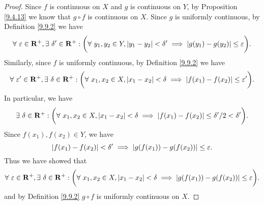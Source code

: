 \begin{proof}
    Since \(f\) is continuous on \(X\) and \(g\) is continuous on \(Y\), by Proposition \ref{9.4.13} we know that \(g \circ f\) is continuous on \(X\).
    Since \(g\) is uniformly continuous, by Definition \ref{9.9.2} we have
    \[
        \forall\ \varepsilon \in \mathbf{R}^+, \exists\ \delta' \in \mathbf{R}^+ : \bigg(\forall\ y_1, y_2 \in Y, \abs*{y_1 - y_2} < \delta' \implies \abs*{g(y_1) - g(y_2)} \leq \varepsilon\bigg).
    \]
    Similarly, since \(f\) is uniformly continuous, by Definition \ref{9.9.2} we have
    \[
        \forall\ \varepsilon' \in \mathbf{R}^+, \exists\ \delta \in \mathbf{R}^+ : \bigg(\forall\ x_1, x_2 \in X, \abs*{x_1 - x_2} < \delta \implies \abs*{f(x_1) - f(x_2)} \leq \varepsilon'\bigg).
    \]
    In particular, we have
    \[
        \exists\ \delta \in \mathbf{R}^+ : \bigg(\forall\ x_1, x_2 \in X, \abs*{x_1 - x_2} < \delta \implies \abs*{f(x_1) - f(x_2)} \leq \delta' / 2 < \delta'\bigg).
    \]
    Since \(f(x_1), f(x_2) \in Y\), we have
    \[
        \abs*{f(x_1) - f(x_2)} < \delta' \implies \abs*{g(f(x_1)) - g(f(x_2))} \leq \varepsilon.
    \]
    Thus we have showed that
    \[
        \forall\ \varepsilon \in \mathbf{R}^+, \exists\ \delta \in \mathbf{R}^+ : \bigg(\forall\ x_1, x_2 \in X, \abs*{x_1 - x_2} < \delta \implies \abs*{g(f(x_1)) - g(f(x_2))} \leq \varepsilon\bigg).
    \]
    and by Definition \ref{9.9.2} \(g \circ f\) is uniformly continuous on \(X\).
\end{proof}